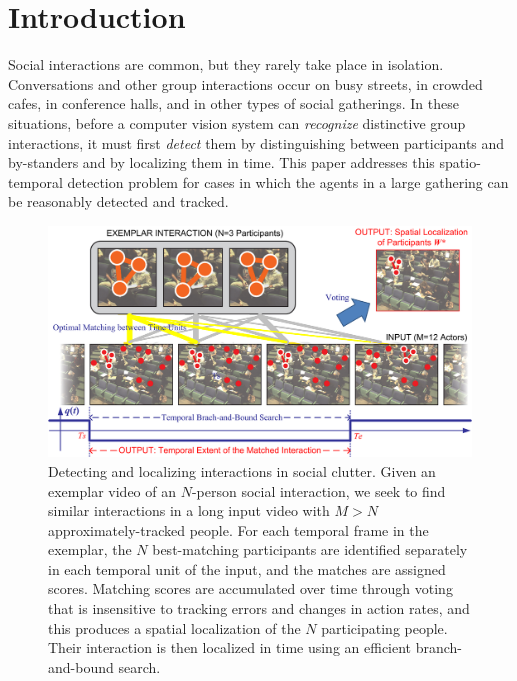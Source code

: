 
\vspace{-15pt}

\section{Introduction}

\vspace{-5pt}


Social interactions are common, but they rarely take place in isolation. Conversations and other group interactions occur on busy streets, in crowded cafes, in conference halls, and in other types of social gatherings. In these situations, before a computer vision system can \emph{recognize} distinctive group interactions, it must first \emph{detect} them by distinguishing between participants and by-standers and by localizing them in time. This paper addresses this spatio-temporal detection problem for cases in which the agents in a large gathering can be reasonably detected and tracked.

\begin{figure}[t]
\vspace{-10pt}
\begin{center}
\includegraphics[width=\columnwidth]{diagram2.png}
\end{center}
\caption{Detecting and localizing interactions in social clutter. Given an exemplar video of an $N$-person social interaction, we seek to find similar interactions in a long input video with $M>N$ approximately-tracked people. For each temporal frame in the exemplar, the $N$ best-matching participants are identified separately in each temporal unit of the input, and the matches are assigned scores. Matching scores are accumulated over time through voting that is insensitive to tracking errors and changes in action rates, and this produces a spatial localization of the $N$ participating people. Their interaction is then localized in time using an efficient branch-and-bound search.}
\label{diagram}
\vspace{-15pt}
\end{figure}

